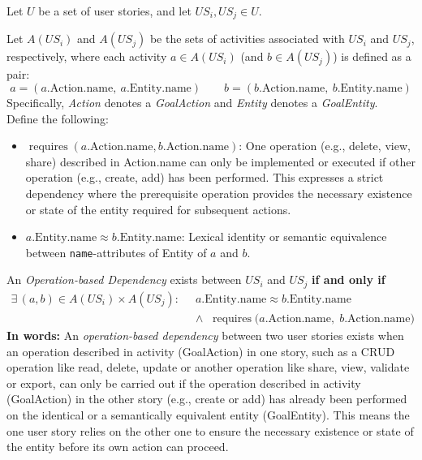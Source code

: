 \documentclass[a4paper, 11 pt, leqno, titlepage = true, toc=bib, oneside]{scrbook}
\begin{document}
\begin{defin}
    Let $U$ be a set of user stories, and let $US_i, US_j \in U$.

    Let $A(US_i)$ and $A(US_j)$ be the sets of activities associated with $US_i$ and $US_j$, respectively, where each activity $a \in A(US_i)$ (and $b \in A(US_j)$) is defined as a pair:
    \[
        a = (a.\text{Action.name},\ a.\text{Entity.name})
        \qquad
        b = (b.\text{Action.name},\ b.\text{Entity.name})
    \]
    Specifically, \textit{Action} denotes a \emph{GoalAction} and \textit{Entity} denotes a \emph{GoalEntity}.\\
    Define the following:
    \begin{itemize}
        \item $\operatorname{requires}(a.\text{Action.name}, b.\text{Action.name})$: One operation (e.g., delete, view, share) described in Action.name can only be implemented or executed if other operation (e.g., create, add) has been performed. This expresses a strict dependency where the prerequisite operation provides the necessary existence or state of the entity required for subsequent actions.
        \item $a.\text{Entity.name} \approx b.\text{Entity.name}$: Lexical identity or semantic equivalence between \texttt{name}-attributes of Entity of $a$ and $b$.
    \end{itemize}

    An \textit{Operation-based Dependency} exists between $US_i$ and $US_j$ \textbf{if and only if}
    \begin{equation*}
        \begin{aligned}
            \exists\, (a, b) \in A(US_i) \times A(US_j):\;\;
             & a.\text{Entity.name} \approx b.\text{Entity.name}\\
             & \land\;\; \operatorname{requires}\big(a.\text{Action.name},\; b.\text{Action.name}\big)
        \end{aligned}
    \end{equation*}
    \textbf{In words: }An \textit{operation-based dependency} between two user stories exists when an operation described in activity (GoalAction) in one story, such as a CRUD operation like read, delete, update or another operation like share, view, validate or export, can only be carried out if the operation described in activity (GoalAction) in the other story (e.g., create or add) has already been performed on the identical or a semantically equivalent entity (GoalEntity). This means the one user story relies on the other one to ensure the necessary existence or state of the entity before its own action can proceed.
\end{defin}
\end{document}
